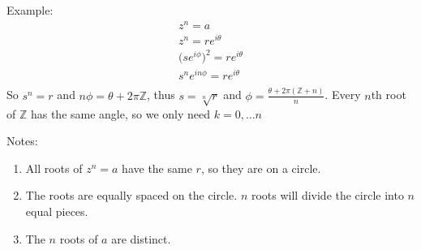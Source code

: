 \documentclass[12pt]{article}
\begin{document}
Example:
\begin{align*}
z^n = a\\
z^n = re^{i\theta}\\
\bigl(se^{i\phi}\bigl)^2 = re^{i\theta}\\
s^ne^{in\phi} = re^{i\theta}\\
\end{align*}
So $s^n = r$ and $n\phi = \theta + 2\pi\mathbb{Z}$, thus $s = \sqrt[n]{r}$ and $\phi = \frac{\theta + 2\pi(\mathbb{Z}+n)}{n}$. Every $n$th root of $\mathbb{Z}$ has the same angle, so we only need $k = 0,\dots n$

Notes:
\begin{enumerate}
\item All roots of $z^n =a$ have the same $r$, so they are on a circle.
\item The roots are equally spaced on the circle. $n$ roots will divide the circle into $n$ equal pieces.
\item The $n$ roots of $a$ are distinct.
\end{enumerate}
\end{document}
